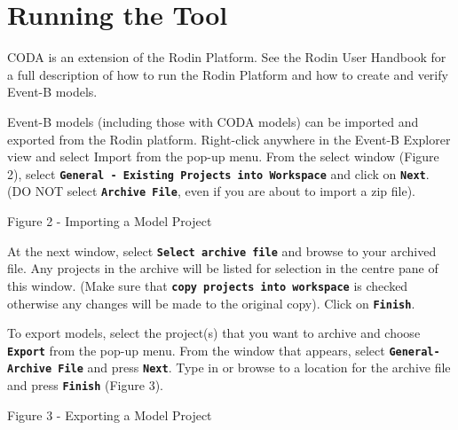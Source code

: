 \section{Running the Tool}
\label{sec:component_diagrams-running}

CODA is an extension of the Rodin Platform. See the Rodin User Handbook  for a full description of how to run the Rodin Platform and how to create and verify Event-B models.


Event-B models (including those with CODA models) can be imported and exported from the Rodin platform. Right-click anywhere in the Event-B Explorer view and select Import from the pop-up menu.
From the select window (Figure 2), select \textbf{\texttt{General - Existing Projects into Workspace}} and click on \textbf{\texttt{Next}}. (DO NOT select \textbf{\texttt{Archive File}}, even if you are about to import a zip file).
 


Figure 2 - Importing a Model Project


At the next window, select \textbf{\texttt{Select archive file}} and browse to your archived file. Any projects in the archive will be listed for selection in the centre pane of this window. (Make sure that \textbf{\texttt{copy projects into workspace}} is checked otherwise any changes will be made to the original copy). Click on \textbf{\texttt{Finish}}.


To export models, select the project(s) that you want to archive and choose \textbf{\texttt{Export}} from the pop-up menu. From the window that appears, select \textbf{\texttt{General-Archive File}} and press \textbf{\texttt{Next}}. Type in or browse to a location for the archive file and press \textbf{\texttt{Finish}} (Figure 3).
 

Figure 3 - Exporting a Model Project

